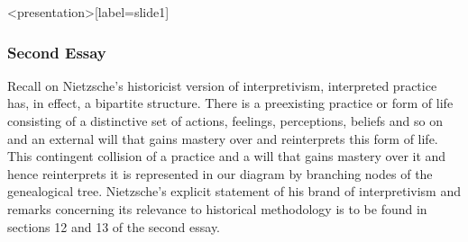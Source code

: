 \begin{frame}<presentation>[label=slide1]
    \frametitle{Second Essay}
\end{frame}

Recall on Nietzsche's historicist version of interpretivism, interpreted practice has, in effect, a bipartite structure. There is a preexisting practice or form of life consisting of a distinctive set of actions, feelings, perceptions, beliefs and so on and an external will that gains mastery over and reinterprets this form of life. This contingent collision of a practice and a will that gains mastery over it and hence reinterprets it is represented in our diagram by branching nodes of the genealogical tree. Nietzsche's explicit statement of his brand of interpretivism and remarks concerning its relevance to historical methodology is to be found in sections 12 and 13 of the second essay.

